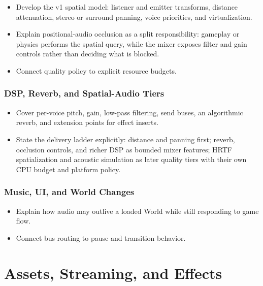 \documentclass[
  11pt,
  letterpaper,
  DIV=11,
  numbers=noendperiod,
  twoside,
  open=right]{scrreprt}
\providecommand{\tightlist}{%
  \setlength{\itemsep}{0pt}\setlength{\parskip}{0pt}}
\begin{document}
\begin{itemize}
\tightlist
\item
  Develop the v1 spatial model: listener and emitter transforms,
  distance attenuation, stereo or surround panning, voice priorities,
  and virtualization.
\item
  Explain positional-audio occlusion as a split responsibility: gameplay
  or physics performs the spatial query, while the mixer exposes filter
  and gain controls rather than deciding what is blocked.
\item
  Connect quality policy to explicit resource budgets.
\end{itemize}

\subsubsection{DSP, Reverb, and Spatial-Audio
Tiers}\label{dsp-reverb-and-spatial-audio-tiers}

\begin{itemize}
\tightlist
\item
  Cover per-voice pitch, gain, low-pass filtering, send buses, an
  algorithmic reverb, and extension points for effect inserts.
\item
  State the delivery ladder explicitly: distance and panning first;
  reverb, occlusion controls, and richer DSP as bounded mixer features;
  HRTF spatialization and acoustic simulation as later quality tiers
  with their own CPU budget and platform policy.
\end{itemize}

\subsubsection{Music, UI, and World
Changes}\label{music-ui-and-world-changes}

\begin{itemize}
\tightlist
\item
  Explain how audio may outlive a loaded World while still responding to
  game flow.
\item
  Connect bus routing to pause and transition behavior.
\end{itemize}

\section{Assets, Streaming, and
Effects}\label{assets-streaming-and-effects}
\end{document}
